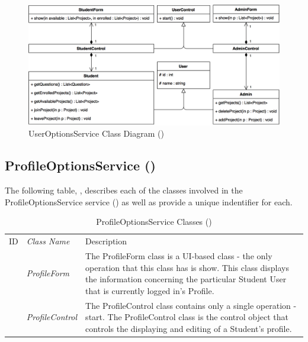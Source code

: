 \documentclass[12pt,letterpaper]{article}
\begin{document}
\begin{figure}[H]
	\centering{}
	\includegraphics[scale=0.33]{imgs/d3/interfaces/user-options.png}
	\caption{UserOptionsService Class Diagram ()}
\end{figure}

\subsection{ProfileOptionsService ()}

The following table, , describes each of the classes involved in the ProfileOptionsService service () as well as provide a unique indentifier for each.

\begin{table}[H]
	\caption{ProfileOptionsService Classes ()} 
	\begin{tabu} to 
	    \tableheader{}ID & Class Name & Description \\
		 & ProfileForm & The ProfileForm class is a UI-based class - the only operation that this class has is show. This class displays the information concerning the particular Student User that is currently logged in's Profile.\\
		 & ProfileControl & The ProfileControl class contains only a single operation - start. The ProfileControl class is the control object that controls the displaying and editing of a Student's profile. \\
	\end{tabu}
\end{table}
\end{document}
